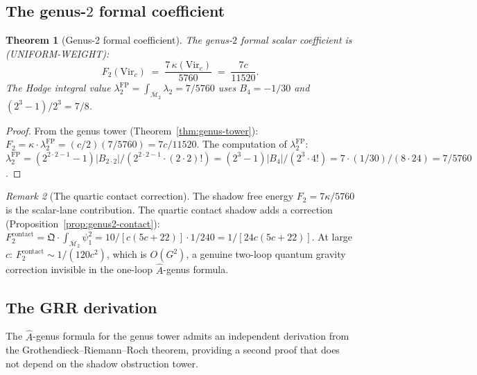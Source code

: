 \documentclass[11pt,reqno]{amsart}
\newtheorem{theorem}{Theorem}[section]
\theoremstyle{definition}
\theoremstyle{remark}
\newtheorem{remark}[theorem]{Remark}
\begin{document}
\subsection{The genus-$2$ formal coefficient}

\begin{theorem}[Genus-$2$ formal coefficient]
\label{thm:F2-derivation}
The genus-$2$ formal scalar coefficient is (UNIFORM-WEIGHT):
\begin{equation}\label{eq:F2-explicit}
F_2(\mathrm{Vir}_c) \;=\;
\frac{7\,\kappa(\mathrm{Vir}_c)}{5760}
\;=\;
\frac{7c}{11520}.
\end{equation}
The Hodge integral value
$\lambda_2^{\mathrm{FP}}
= \int_{\overline{\mathcal{M}}_2}\lambda_2
= 7/5760$
uses $B_4 = -1/30$ and
$(2^3-1)/2^3 = 7/8$.
\end{theorem}

\begin{proof}
From the genus tower (Theorem~\ref{thm:genus-tower}):
$F_2 = \kappa \cdot \lambda_2^{\mathrm{FP}}
= (c/2)(7/5760) = 7c/11520$.
The computation of $\lambda_2^{\mathrm{FP}}$:
$\lambda_2^{\mathrm{FP}}
= (2^{2 \cdot 2 - 1}-1)|B_{2 \cdot 2}|
  /(2^{2 \cdot 2 - 1}\cdot (2 \cdot 2)!)
= (2^3-1)|B_4|/(2^3 \cdot 4!)
= 7 \cdot (1/30)/(8 \cdot 24)
= 7/5760$.
\end{proof}

\begin{remark}[The quartic contact correction]
\label{rem:quartic-contact-F2}
The shadow free energy $F_2 = 7\kappa/5760$ is the scalar-lane
contribution. The quartic contact shadow adds a correction
(Proposition~\ref{prop:genus2-contact}):
$F_2^{\mathrm{contact}} = \mathfrak{Q} \cdot
\int_{\overline{\mathcal{M}}_2}\psi_1^2
= 10/[c(5c+22)] \cdot 1/240
= 1/[24c(5c+22)]$.
At large $c$: $F_2^{\mathrm{contact}} \sim 1/(120c^2)$, which
is $O(G^2)$, a genuine two-loop quantum gravity correction
invisible in the one-loop $\hat{A}$-genus formula.
\end{remark}

\subsection{The GRR derivation}

The $\hat{A}$-genus formula for the genus tower admits an
independent derivation from the Grothendieck--Riemann--Roch
theorem, providing a second proof that does not depend on the
shadow obstruction tower.
\end{document}
